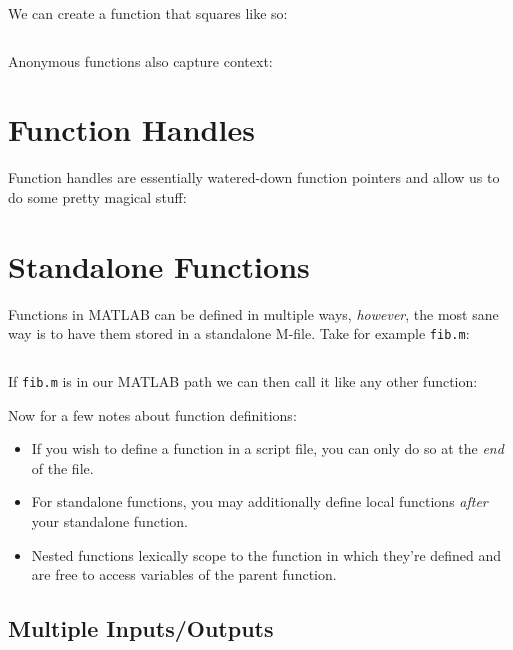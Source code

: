 \documentclass{article}
\begin{document}
We can create a function that squares like so:

\inputminted{matlab}{04-functions.d/sq.m}

Anonymous functions also capture context:


\section{Function Handles}

Function handles are essentially watered-down function pointers and
allow us to do some pretty magical stuff:


\section{Standalone Functions}

Functions in MATLAB can be defined in multiple ways, \emph{however}, the
most sane way is to have them stored in a standalone M-file.  Take for
example \texttt{fib.m}:

\inputminted{matlab}{04-functions.d/fib.m}

If \texttt{fib.m} is in our MATLAB path we can then call it like any
other function:


\newpage

Now for a few notes about function definitions:

\begin{itemize}
	\item
		If you wish to define a function in a script file, you
		can only do so at the \emph{end} of the file.

	\item
		For standalone functions, you may additionally define
		local functions \emph{after} your standalone function.

	\item
		Nested functions lexically scope to the function in
		which they're defined and are free to access variables
		of the parent function.
\end{itemize}

\subsection{Multiple Inputs/Outputs}
\end{document}
